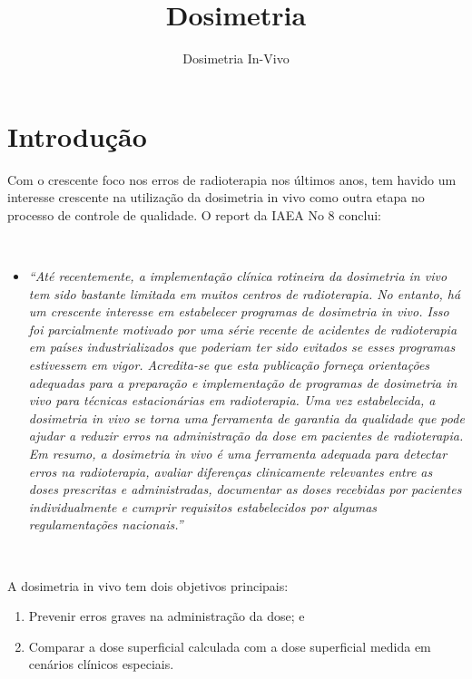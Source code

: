 \documentclass[11pt,a4paper]{article}
\title{\LobsterTwo\Huge{Dosimetria}}
\author{\LobsterTwo\Large{Dosimetria In-Vivo}\nocite{*}}
\date{\LobsterTwo{Dalila Mendonça}}
\newcounter{exemplo}
\begin{document}
	\maketitle

\section{Introdução}

	Com o crescente foco nos erros de radioterapia nos últimos anos, tem havido um interesse crescente na utilização da dosimetria in vivo como outra etapa no processo de controle de qualidade. O report da IAEA No 8 conclui:

	\

  	\begin{exemplo}
		\begin{itemize}
			\item \textit{``Até recentemente, a implementação clínica rotineira da dosimetria in vivo tem sido bastante limitada em muitos centros de radioterapia. No entanto, há um crescente interesse em estabelecer programas de dosimetria in vivo. Isso foi parcialmente motivado por uma série recente de acidentes de radioterapia em países industrializados que poderiam ter sido evitados se esses programas estivessem em vigor. Acredita-se que esta publicação forneça orientações adequadas para a preparação e implementação de programas de dosimetria in vivo para técnicas estacionárias em radioterapia. Uma vez estabelecida, a dosimetria in vivo se torna uma ferramenta de garantia da qualidade que pode ajudar a reduzir erros na administração da dose em pacientes de radioterapia. Em resumo, a dosimetria in vivo é uma ferramenta adequada para detectar erros na radioterapia, avaliar diferenças clinicamente relevantes entre as doses prescritas e administradas, documentar as doses recebidas por pacientes individualmente e cumprir requisitos estabelecidos por algumas regulamentações nacionais.''}
		\end{itemize}
	\end{exemplo}
		
	\
		
	A dosimetria in vivo tem dois objetivos principais:
	
	\begin{enumerate}
		\item Prevenir erros graves na administração da dose; e
		\item Comparar a dose superficial calculada com a dose superficial medida em cenários clínicos especiais.
	\end{enumerate}
\end{document}
